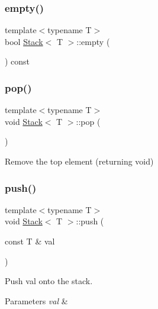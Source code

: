 \subsubsection{\texorpdfstring{empty()}{empty()}}
{\footnotesize\ttfamily template$<$typename T$>$ \\
bool \hyperlink{class_stack}{Stack}$<$ T $>$\+::empty (\begin{DoxyParamCaption}{ }\end{DoxyParamCaption}) const\hspace{0.3cm}{\ttfamily [inline]}}

\mbox{\label{class_stack_a2723aec5c7e2611b97fcffeb7709de33}} 
\subsubsection{\texorpdfstring{pop()}{pop()}}
{\footnotesize\ttfamily template$<$typename T$>$ \\
void \hyperlink{class_stack}{Stack}$<$ T $>$\+::pop (\begin{DoxyParamCaption}{ }\end{DoxyParamCaption})\hspace{0.3cm}{\ttfamily [inline]}}

Remove the top element (returning void)\mbox{\label{class_stack_a6e8312460808f468b004d709d3308757}} 
\subsubsection{\texorpdfstring{push()}{push()}\hspace{0.1cm}{\footnotesize\ttfamily [1/2]}}
{\footnotesize\ttfamily template$<$typename T$>$ \\
void \hyperlink{class_stack}{Stack}$<$ T $>$\+::push (\begin{DoxyParamCaption}\item[{const T \&}]{val }\end{DoxyParamCaption})\hspace{0.3cm}{\ttfamily [inline]}}



Push val onto the stack. 


\begin{DoxyParams}{Parameters}
{\em val} & \\
\hline
\end{DoxyParams}
\mbox{\label{class_stack_ace7170c5a65f27155d77af269054943a}} 
